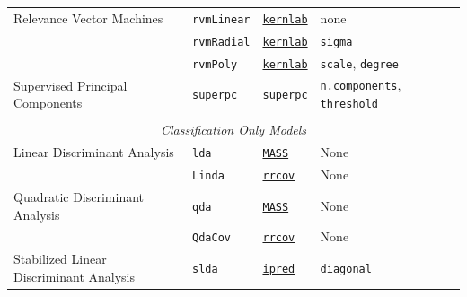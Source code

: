 \documentclass[12pt]{article}
\newcommand{\code}[1]{\mbox{\footnotesize\color{darkblue}\texttt{#1}}}
\begin{document}
\begin{landscape}
\begin{longtable}{lllll}
      Relevance Vector Machines  &
         \code{rvmLinear} & 
             {\tt \href{http://cran.r-project.org/web/packages/kernlab/index.html}{kernlab}}        & 
            none & \\            
             
  &
         \code{rvmRadial} & 
            {\tt \href{http://cran.r-project.org/web/packages/kernlab/index.html}{kernlab}}       & 
            \code{sigma} & \\              
           
  &
         \code{rvmPoly} & 
            {\tt \href{http://cran.r-project.org/web/packages/kernlab/index.html}{kernlab}}       & 
            \code{scale}, \code{degree} & \\                        

\rowcolor[rgb]{.95, .95, .95}
            
      Supervised Principal Components&
         \code{superpc}  &
         {\tt \href{http://cran.r-project.org/web/packages/superpc/index.html}{superpc}} &
         \code{n.components}, \code{threshold} & \\
            
\\             
\multicolumn{5}{c}{{{\em Classification Only Models}}} \\ 

\rowcolor[rgb]{.95, .95, .95}         
      Linear Discriminant Analysis &
         \code{lda} & 
             {\tt \href{http://cran.r-project.org/web/packages/MASS/index.html}{MASS}}       &          
            None & \\
\rowcolor[rgb]{.95, .95, .95}                     
          &
         \code{Linda} & 
              {\tt \href{http://cran.r-project.org/web/packages/rrcov/index.html}{rrcov}}       &          
            None & \\
                        
            
      Quadratic Discriminant Analysis &
         \code{qda} & 
             {\tt \href{http://cran.r-project.org/web/packages/MASS/index.html}{MASS}}         &          
            None & \\ 
            
      &   \code{QdaCov} & 
             {\tt \href{http://cran.r-project.org/web/packages/rrcov/index.html}{rrcov}}        &          
            None & \\            
            
\rowcolor[rgb]{.95, .95, .95}                     
      Stabilized Linear Discriminant Analysis&
         \code{slda} & 
              {\tt \href{http://cran.r-project.org/web/packages/ipred/index.html}{ipred}}        &          
            \code{diagonal} & \\  
      

\end{longtable}
\end{landscape}
\end{document}
